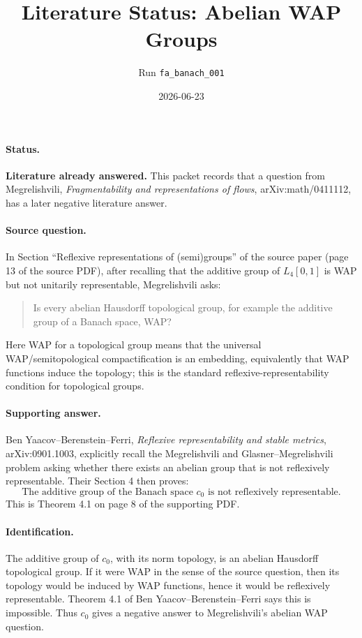 \documentclass[11pt]{article}
\title{Literature Status: Abelian WAP Groups}
\author{Run \texttt{fa\_banach\_001}}
\date{2026-06-23}
\begin{document}
\sloppy
\maketitle

\paragraph{Status.}
\textbf{Literature already answered.} This packet records that a question
from Megrelishvili, \emph{Fragmentability and representations of flows},
arXiv:math/0411112, has a later negative literature answer.

\paragraph{Source question.}
In Section ``Reflexive representations of (semi)groups'' of the source paper
(page 13 of the source PDF), after recalling that the additive group of
\(L_4[0,1]\) is WAP but not unitarily representable, Megrelishvili asks:
\begin{quote}
Is every abelian Hausdorff topological group, for example the additive group
of a Banach space, WAP?
\end{quote}
Here WAP for a topological group means that the universal WAP/semitopological
compactification is an embedding, equivalently that WAP functions induce the
topology; this is the standard reflexive-representability condition for
topological groups.

\paragraph{Supporting answer.}
Ben Yaacov--Berenstein--Ferri,
\emph{Reflexive representability and stable metrics}, arXiv:0901.1003,
explicitly recall the Megrelishvili and Glasner--Megrelishvili problem asking
whether there exists an abelian group that is not reflexively representable.
Their Section 4 then proves:
\[
\text{The additive group of the Banach space \(c_0\) is not reflexively
representable.}
\]
This is Theorem 4.1 on page 8 of the supporting PDF.

\paragraph{Identification.}
The additive group of \(c_0\), with its norm topology, is an abelian Hausdorff
topological group. If it were WAP in the sense of the source question, then its
topology would be induced by WAP functions, hence it would be reflexively
representable. Theorem 4.1 of Ben Yaacov--Berenstein--Ferri says this is
impossible. Thus \(c_0\) gives a negative answer to Megrelishvili's abelian
WAP question.
\end{document}
